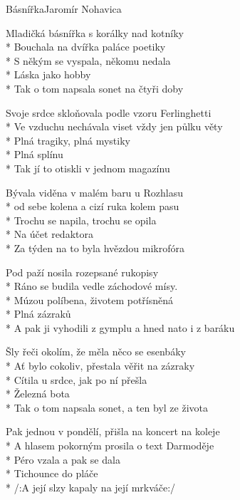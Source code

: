 \documentclass[10.5pt]{book}
\begin{document}
\begin{poem}{Básnířka}{Jaromír Nohavica}

\settowidth{\versewidth}{Pak jednou v pondělí, přišla na koncert na koleje}

Mladičká básnířka s korálky nad kotníky \\*
Bouchala na dvířka paláce poetiky\\*
S někým se vyspala, někomu nedala \\*
Láska jako hobby \\*
Tak o tom napsala sonet na čtyři doby 

Svoje srdce skloňovala podle vzoru Ferlinghetti \\*
Ve vzduchu nechávala viset vždy jen půlku věty \\*
Plná tragiky, plná mystiky \\*
Plná splínu \\*
Tak jí to otiskli v jednom magazínu 

Bývala viděna v malém baru u Rozhlasu \\*
od sebe kolena a cizí ruka kolem pasu \\*
Trochu se napila, trochu se opila \\*
Na účet redaktora \\*
Za týden na to byla hvězdou mikrofóra 

Pod paží nosila rozepsané rukopisy \\*
Ráno se budila vedle záchodové mísy. \\*
Múzou políbena, životem potřísněná\\* 
Plná zázraků \\*
A pak ji vyhodili z gymplu a hned nato i z baráku 

Šly řeči okolím, že měla něco se esenbáky \\*
Ať bylo cokoliv, přestala věřit na zázraky \\*
Cítila u srdce, jak po ní přešla \\*
Železná bota \\*
Tak o tom napsala sonet, a ten byl ze života 

Pak jednou v pondělí, přišla na koncert na koleje \\*
A hlasem pokorným prosila o text Darmoděje \\*
Péro vzala a pak se dala \\*
Tichounce do pláče \\*
/:A její slzy kapaly na její mrkváče:/ 

\end{poem}
\end{document}
